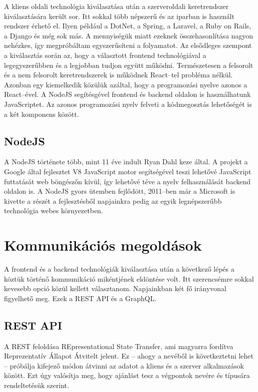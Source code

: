 A kliens oldali technológia kiválasztása után a szerveroldali keretrendszer kiválasztására került sor.
Itt sokkal több népszerű és az iparban is használt rendszer érhető el. Ilyen például a DotNet, a Spring, a Laravel, a Ruby on Rails, a Django és még sok más. A mennyiségük miatt ezeknek összehasonlítása nagyon nehézkes, így megpróbáltam egyszerűsíteni a folyamatot. Az elsődleges szempont a kiválasztás során az, hogy a választott frontend technológiával a legegyszerűbben és a legjobban tudjon együtt működni. Természetesen a felsorolt és a nem felsorolt keretrendszerek is működnek React–tel probléma nélkül. Azonban egy kiemelkedik közülük azáltal, hogy a programozási nyelve azonos a React–ével. A NodeJS segítésgével frontend és backend oldalon is használhatunk JavaScriptet. Az azonos programozási nyelv felveti a kódmegosztás lehetőségét is a két komponens között. 

\subsection{NodeJS}
A NodeJS története több, mint 11 éve indult Ryan Dahl keze által. A projekt a Google által fejlesztet V8 JavaScript motor segítségével teszi lehetővé JavaScript futtatását web böngészőn kívül, így lehetővé téve a nyelv felhasználását backend oldalon is. A NodeJS gyors ütemben fejlődött, 2011–ben már a Microsoft is kivette a részét a fejlesztésből napjainkra pedig az egyik legnépszerűbb technológia webes környezetben.\cite{NodeJS}

\section{Kommunikációs megoldások}

A frontend és a backend technológiák kiválasztása után a következő lépés a köztük történő kommunikáció mikéntjének eldöntése volt.
Itt szerencsémre sokkal kevesebb opció közül kellett választanom. Napjainkban két fő irányvonal figyelhető meg. Ezek a REST API és a GraphQL.

\subsection{REST API}
A REST feloldása REpresentational State Transfer, ami magyarra fordítva Reprezentatív Állapot Átvitelt jelent. Ez – ahogy a nevéből is következtetni lehet – próbálja kifejező módon átvinni az adatot a kliens és a szerver alkalmazások között.
Ezt úgy valósítja meg, hogy ajánlást tesz a végpontok nevére és típusára rendeltetésük szerint.


